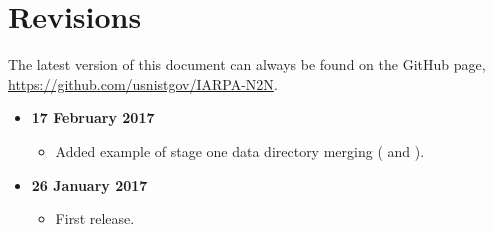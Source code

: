 \section*{Revisions}
\label{sec:revisions}
The latest version of this document can always be found on the GitHub page, \url{https://github.com/usnistgov/IARPA-N2N}.

\begin{itemize}
	\item \textbf{17 February 2017}
	\begin{itemize}
		\item Added example of stage one data directory merging
		( and
		).
	\end{itemize}
	\item \textbf{26 January 2017}
	\begin{itemize}
		\item First release.
	\end{itemize}
\end{itemize}

